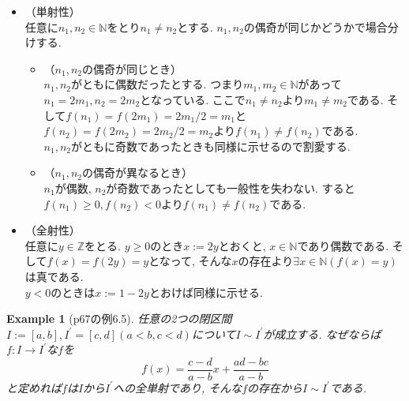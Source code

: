 \documentclass[a4j,dvipdfmx,10pt]{ujreport}
\makeatletter
\theoremstyle{mystyle}
\newtheorem{my-example}[my-theorem]{Example}
\newcommand{\thmsymbol}{$\blacksquare$}
\newenvironment{example}[1][]{
  \begin{my-example}[#1]%
  \renewcommand{\qedsymbol}{\thmsymbol}\pushQED{\qed}}%
  {\popQED\end{my-example}
}
\renewcommand{\proofname}{Proof}
\renewenvironment{proof}[1][\proofname]{\par
  \pushQED{\qed}%
  \normalfont \topsep6\p@\@plus6\p@\relax
  \trivlist
  \item[\hskip\labelsep
        \itshape
    {\bf\underline{#1}\@addpunct{\ }}]\ignorespaces
}{%
  \popQED\endtrivlist\@endpefalse
}
\newcommand{\tempdefeq}{:=}
\newcommand{\dash}[1]{#1 ^{\prime}}
\newcommand{\map}[3]{#1\colon #2 \to #3}
\makeatother
\begin{document}
\begin{proof}
  \mbox{}
  \begin{itemize}
    \item[] \hspace{-0.5cm}（単射性） \\
      任意に$n_1,n_2\in \mathbb{N}$をとり$n_1\neq n_2$とする.
      $n_1,n_2$の偶奇が同じかどうかで場合分けする.
      \begin{itemize}
        \item[] \hspace{-0.5cm}（$n_1,n_2$の偶奇が同じとき） \\
          $n_1,n_2$がともに偶数だったとする.
          つまり$m_1,m_2\in \mathbb{N}$があって$n_1=2m_1,n_2=2m_2$となっている.
          ここで$n_1\neq n_2$より$m_1\neq m_2$である.
          そして$f(n_1)=f(2m_1)=2m_1/2=m_1$と$f(n_2)=f(2m_2)=2m_2/2=m_2$より$f(n_1)\neq f(n_2)$である. \\
          $n_1,n_2$がともに奇数であったときも同様に示せるので割愛する.

        \item[] \hspace{-0.5cm}（$n_1,n_2$の偶奇が異なるとき） \\
          $n_1$が偶数,
          $n_2$が奇数であったとしても一般性を失わない.
          すると$f(n_1)\geq 0,f(n_2)<0$より$f(n_1)\neq f(n_2)$である.

      \end{itemize}

    \item[] \hspace{-0.5cm}（全射性） \\
      任意に$y\in \mathbb{Z}$をとる.
      $y\geq 0$のとき$x\tempdefeq 2y$とおくと,
      $x\in \mathbb{N}$であり偶数である.
      そして$f(x)=f(2y)=y$となって,
      そんな$x$の存在より$\exists x\in \mathbb{N}( f(x)=y )$は真である. \\
      $y<0$のときは$x\tempdefeq 1-2y$とおけば同様に示せる.
    
  \end{itemize}
\end{proof}

\begin{example}[p67の例6.5]
  \label{example:任意の閉区間同士は対等}
  任意の2つの閉区間$I\tempdefeq [a,b],\dash{I}=[c,d](a<b,c<d)$について$I\sim \dash{I}$が成立する.
  なぜならば$\map{f}{I}{\dash{I}}$な$f$を
  \begin{equation*}
    f(x)=\frac{c-d}{a-b}x+\frac{ad-bc}{a-b}
  \end{equation*}
  と定めれば$f$は$I$から$\dash{I}$への全単射であり,
  そんな$f$の存在から$I\sim \dash{I}$である.
\end{example}
\end{document}
